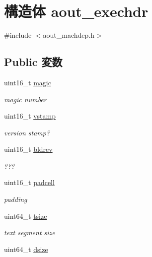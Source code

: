 \hypertarget{structaout__exechdr}{
\section{構造体 aout\_\-exechdr}
\label{structaout__exechdr}
}


{\ttfamily \#include $<$aout\_\-machdep.h$>$}\subsection*{Public 変数}
\begin{DoxyCompactItemize}
\item 
uint16\_\-t \hyperlink{structaout__exechdr_a8c61e64b8675498cee79c59d3f8131e2}{magic}
\begin{DoxyCompactList}\small\item\em magic number \item\end{DoxyCompactList}\item 
uint16\_\-t \hyperlink{structaout__exechdr_a13649f90a560cfdf9c2ec241beaa866c}{vstamp}
\begin{DoxyCompactList}\small\item\em version stamp? \item\end{DoxyCompactList}\item 
uint16\_\-t \hyperlink{structaout__exechdr_a4821bde2c206ea0508c21735f751df63}{bldrev}
\begin{DoxyCompactList}\small\item\em ??? \item\end{DoxyCompactList}\item 
uint16\_\-t \hyperlink{structaout__exechdr_aa81abd61e68b84aa0d2833dc1b9a94bf}{padcell}
\begin{DoxyCompactList}\small\item\em padding \item\end{DoxyCompactList}\item 
uint64\_\-t \hyperlink{structaout__exechdr_aae926eba3aa14c71c8c7ca5960ea49e3}{tsize}
\begin{DoxyCompactList}\small\item\em text segment size \item\end{DoxyCompactList}\item 
uint64\_\-t \hyperlink{structaout__exechdr_a81b22f2ab2aff1692dcf9284be80bc2c}{dsize}

\end{DoxyCompactItemize}
